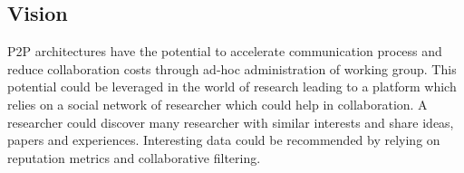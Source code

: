 \subsection{Vision}
P2P architectures have the potential to accelerate communication process and reduce collaboration costs through ad-hoc administration of working group. This potential could be leveraged in the world of research leading to a platform which relies on a social network of researcher which could help in collaboration. A researcher could discover many researcher with similar interests and share ideas, papers and experiences. Interesting data could be recommended by relying on reputation metrics and collaborative filtering.
